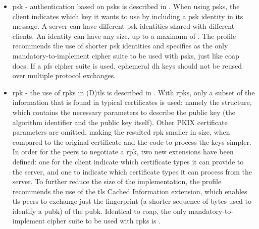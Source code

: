 \documentclass{llncs}
\begin{document}
\begin{itemize}
  \item \gls{psk} - authentication based on \gls{psk}s is described in
  \cite{RFC4279}. When using \gls{psk}s, the client indicates which
  key it wants to use by including a \gls{psk} identity in its  message.
  A server can have different \gls{psk} identities shared with different clients.
  An identity can have any size, up to a maximum of .
  The profile recommends the use of shorter \gls{psk} identities and specifies
   as the only mandatory-to-implement
  cipher suite to be used with \gls{psk}s, just like \gls{coap} does. If a \gls{pfs} cipher suite is used, ephemeral
  \gls{dh} keys should not be reused over multiple protocol exchanges.

  \item \gls{rpk} - the use of \gls{rpk}s in (D)\gls{tls} is described in \cite{RFC7250}.
  With \gls{rpk}s, only a subset of the information that is found in typical certificates
  is used: namely the  structure, which contains
  the necessary parameters to describe the public key (the algorithm identifier
  and the public key itself). Other PKIX certificate\cite{RFCabc} parameters are
  omitted, making the resulted \gls{rpk} smaller in size, when compared to the
  original certificate and the code to process the keys simpler. In order for the
  peers to negotiate a \gls{rpk}, two new extensions have been defined:
  one for the client indicate which certificate types it can provide to the server, and one to indicate which certificate types it can process from the server. To further reduce the size of the implementation, the profile
  recommends the use of the \gls{tls} Cached Information extension\cite{RFC7924}, which
  enables \gls{tls} peers to exchange just the fingerprint (a shorter sequence of bytes
  used to identify a \gls{pubk}) of the \gls{pubk}. Identical to \gls{coap}, the only mandatory-to-implement
  cipher suite to be used with \gls{rpk}s is .


\end{itemize}
\end{document}
